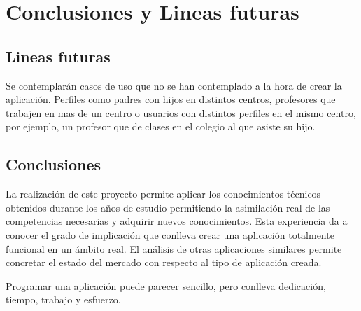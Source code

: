 %
%
%
%

\cleardoublepage
\chapter{Conclusiones y Lineas futuras}
\label{chap:conclusions}

	\section{Lineas futuras}
		Se contemplarán casos de uso que no se han contemplado a la hora de crear la aplicación. Perfiles como padres con hijos en distintos centros, profesores que trabajen en mas de un centro o usuarios con distintos perfiles en el mismo centro, por ejemplo, un profesor que de clases en el colegio al que asiste su hijo.
		
	\section{Conclusiones}
		La realización de este proyecto permite aplicar los conocimientos técnicos obtenidos durante los años de estudio permitiendo la asimilación real de las competencias necesarias y adquirir nuevos conocimientos.
		Esta experiencia da a conocer el grado de implicación que conlleva crear una aplicación totalmente funcional en un ámbito real. El análisis de otras aplicaciones similares permite concretar el estado del mercado con respecto al tipo de aplicación creada.
		
		\bigskip
		Programar una aplicación puede parecer sencillo, pero conlleva dedicación, tiempo, trabajo y esfuerzo.